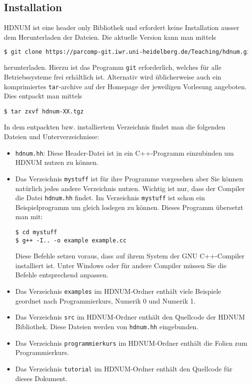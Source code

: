 \documentclass[a4paper,11pt]{article}
\theoremstyle{definition}
\begin{document}
\subsection{Installation}

HDNUM ist eine \glqq{}header only\grqq{} Bibliothek und erfordert keine Installation
ausser dem Herunterladen der Dateien. Die aktuelle Version kann man mittels
\begin{lstlisting}[basicstyle=\ttfamily\footnotesize,language=bash,frame=single]
$ git clone https://parcomp-git.iwr.uni-heidelberg.de/Teaching/hdnum.git
\end{lstlisting}
herunterladen. Hierzu ist das Programm \lstinline{git} erforderlich, welches für alle
Betriebssysteme frei erhältlich ist. Alternativ wird üblicherweise auch ein
komprimiertes \lstinline{tar}-archive auf der Homepage der jeweiligen Vorlesung angeboten.
Dies entpackt man mittels
\begin{lstlisting}[basicstyle=\ttfamily\small,frame=single]
$ tar zxvf hdnum-XX.tgz
\end{lstlisting}
In dem entpackten bzw. installiertem Verzeichnis findet man die folgenden Dateien und
Unterverzeichnisse:
\begin{itemize}
\item \lstinline{hdnum.hh}: Diese Header-Datei ist in ein C++-Programm einzubinden um HDNUM
nutzen zu können.
\item Das Verzeichnis \lstinline{mystuff} ist für ihre Programme vorgesehen aber Sie können
natürlich jedes andere Verzeichnis nutzen. Wichtig ist nur, dass der Compiler die Datei
\lstinline{hdnum.hh} findet. Im Verzeichnis \lstinline{mystuff} ist schon ein Beispielprogramm
um gleich loslegen zu können. Dieses Programm übersetzt man mit:
\begin{lstlisting}[basicstyle=\ttfamily\small,frame=single]
$ cd mystuff
$ g++ -I.. -o example example.cc
\end{lstlisting}
Diese Befehle setzen voraus, dass auf ihrem System der GNU C++-Compiler installiert ist.
Unter Windows oder für andere Compiler müssen Sie die Befehle entsprechend anpassen.
\item Das Verzeichnis \lstinline{examples} im HDNUM-Ordner enthält viele Beispiele
geordnet nach Programmierkurs, Numerik 0 und Numerik 1.
\item Das Verzeichnis \lstinline{src} im HDNUM-Ordner enthält den Quellcode
der HDNUM Bibliothek. Diese Dateien werden von \lstinline{hdnum.hh} eingebunden.
\item Das Verzeichnis \lstinline{programmierkurs} im HDNUM-Ordner enthält
die Folien zum Programmierkurs.
\item Das Verzeichnis \lstinline{tutorial} im HDNUM-Ordner enthält den Quellcode
für dieses Dokument.
\end{itemize}
\end{document}
